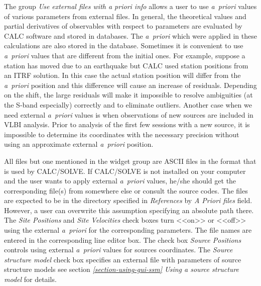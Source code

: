 \documentclass [10pt,letterpaper]{report}
\begin{document}
The group {\sl Use external files with a priori info} allows a user to
use {\it a~priori} values of various parameters from external files. In
general, the theoretical values and partial derivatives of observables
with respect to parameters are evaluated by CALC software and stored in
databases. The {\it a~priori} which were applied in these
calculations are also stored in the database. Sometimes it is convenient
to use {\it a~priori} values that are different from the initial
ones. For example, suppose a station has moved due to an earthquake but
CALC used station positions from an ITRF solution. In this case the
actual station position will differ from the {\it a~priori} position and
this difference will cause an increase of residuals. Depending on the
shift, the large residuals will make it impossible to resolve
ambiguities (at the S-band especially) correctly and to eliminate
outliers. Another case when we need external {\it a~priori} values is
when observations of new sources are included in VLBI analysis. Prior
to analysis of the first few sessions with a new source, it is
impossible to determine its coordinates with the necessary precision
without using an approximate external {\it a~priori} position.

All files but one mentioned in the widget group are ASCII files in the format that
is used by CALC/SOLVE. If CALC/SOLVE is not installed on your computer
and the user wants to apply external {\it a~priori} values, he/she
should get the corresponding file(s) from somewhere else or consult the
source codes. The files are expected to be in the directory specified in
{\sl References} by {\sl A Priori files} field. However, a user can
overwrite this assumption specifying an absolute path there.
The {\sl Site Positions} and {\sl Site Velocities} check boxes turn
<<on>> or <<off>> using the external {\it a~priori} for the
corresponding parameters. The file names are entered in the
corresponding line editor box.
The check box {\sl Source Positions}
controls using external {\it a~priori} values for sources coordinates.
The {\sl Source structure model} check box specifies an external file
with parameters of source structure models
see section \emph{\ref{section-using-gui-ssm} Using a source structure model} for details.
\end{document}
